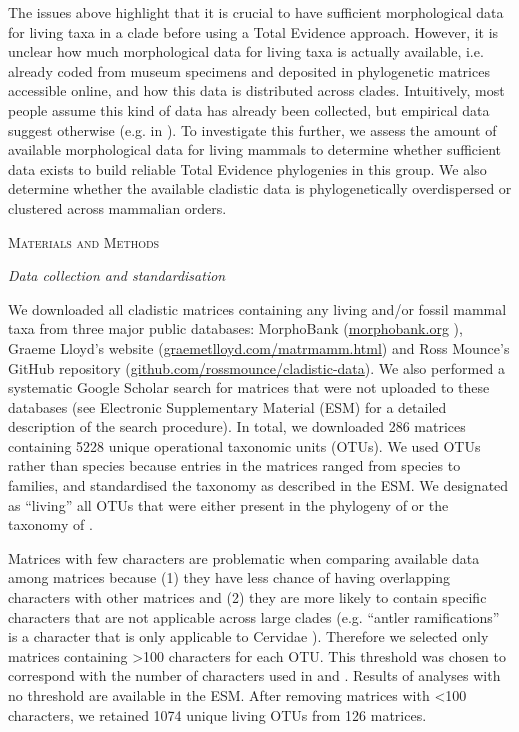 \documentclass[12pt,letterpaper]{article}
\renewcommand{\section}[1]{%
\bigskip
\begin{center}
\begin{Large}
\normalfont\scshape #1
\medskip
\end{Large}
\end{center}}
\renewcommand{\subsection}[1]{%
\bigskip
\begin{center}
\begin{large}
\normalfont\itshape #1
\end{large}
\end{center}}
\begin{document}
The issues above highlight that it is crucial to have sufficient morphological data for living taxa in a clade before using a Total Evidence approach.
However, it is unclear how much morphological data for living taxa is actually available, i.e. already coded from museum specimens and deposited in phylogenetic matrices accessible online, and how this data is distributed across clades.
Intuitively, most people assume this kind of data has already been collected, but empirical data suggest otherwise (e.g. in \cite{ronquista2012,slaterphylogenetic2013,beckancient2014}).
To investigate this further, we assess the amount of available morphological data for living mammals to determine whether sufficient data exists to build reliable Total Evidence phylogenies in this group.
We also determine whether the available cladistic data is phylogenetically overdispersed or clustered across mammalian orders.

%
%
\section{Materials and Methods}
\subsection{Data collection and standardisation}
We downloaded all cladistic matrices containing any living and/or fossil mammal taxa from three major public databases: MorphoBank (\url{morphobank.org} \cite{morphobank}), Graeme Lloyd's website (\url{graemetlloyd.com/matrmamm.html}) and Ross Mounce's GitHub repository (\url{github.com/rossmounce/cladistic-data}).
We also performed a systematic Google Scholar search for matrices that were not uploaded to these databases (see Electronic Supplementary Material (ESM) for a detailed description of the search procedure).
In total, we downloaded 286 matrices containing 5228 unique operational taxonomic units (OTUs). 
We used OTUs rather than species because%
 entries in the matrices ranged from species to families, and standardised the taxonomy as described in the ESM. 
We designated as ``living'' all OTUs that were either present in the phylogeny of \cite{BinindaEmonds} or the taxonomy of \cite{wilson2005mammal}.

Matrices with few characters are problematic when comparing available data among matrices because (1) they have less chance of having overlapping characters with other matrices \cite{wagner2000} and (2) they are more likely to contain specific characters that are not applicable%
 across large clades (e.g. ``antler ramifications'' is a character that is only applicable to Cervidae \cite{Brazeau2011}).
Therefore we selected only matrices containing \textgreater 100 characters for each OTU.
This threshold was chosen to correspond with the number of characters used in \cite{GuillermeCooper} and \cite{harrisonamong-character2014}.
Results of analyses with no threshold are available in the ESM. 
After removing matrices with \textless 100 characters, we retained 1074 unique living OTUs from 126 matrices. %
\end{document}
